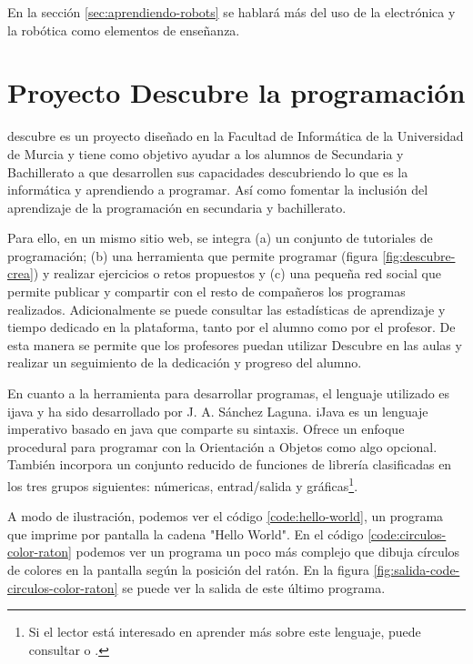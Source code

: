 En la sección \ref{sec:aprendiendo-robots} se hablará más del uso de la electrónica y la robótica como elementos de enseñanza.



\section{Proyecto Descubre la programación}
\label{sec:descubre}

\Gls{descubre}\cite{descubre} es un proyecto diseñado en la Facultad de Informática de la Universidad de Murcia y tiene como objetivo ayudar a los alumnos de Secundaria y Bachillerato a que desarrollen sus capacidades descubriendo lo que es la informática y aprendiendo a programar. Así como fomentar la inclusión del aprendizaje de la programación en secundaria y bachillerato.

Para ello, en un mismo sitio web, se integra (a) un conjunto de tutoriales de programación; (b) una herramienta que permite programar (figura \ref{fig:descubre-crea}) y realizar ejercicios o retos propuestos y (c) una pequeña red social que permite publicar y compartir con el resto de compañeros los programas realizados. Adicionalmente se puede consultar las estadísticas de aprendizaje y tiempo dedicado en la plataforma, tanto por el alumno como por el profesor. De esta manera se permite que los profesores puedan utilizar Descubre en las aulas y realizar un seguimiento de la dedicación y progreso del alumno.

En cuanto a la herramienta para desarrollar programas, el lenguaje utilizado es \gls{ijava}\cite{sanchez2009ijava} y ha sido desarrollado por J. A. Sánchez Laguna. iJava es un lenguaje imperativo basado en \Gls{java} que comparte su sintaxis. Ofrece un enfoque procedural para programar con la Orientación a Objetos como algo opcional.
 También incorpora un conjunto reducido de funciones de librería clasificadas en los tres grupos siguientes: númericas, entrad/salida y gráficas\footnote{Si el lector está interesado en aprender más sobre este lenguaje, puede consultar \cite{sanchez2009ijava} o \cite{descubre-lenguaje}.}.

A modo de ilustración, podemos ver el código \ref{code:hello-world}, un programa que imprime por pantalla la cadena "Hello World". En el código \ref{code:circulos-color-raton} podemos ver un programa un poco más complejo que dibuja círculos de colores en la pantalla según la posición del ratón. En la figura \ref{fig:salida-code-circulos-color-raton} se puede ver la salida de este último programa.


